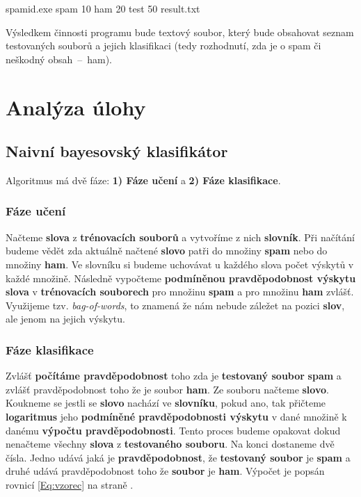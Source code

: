 \documentclass[12pt]{report}
\newcommand\myindent[1]{						
	\setlength\parindent{5mm}
	#1
	\setlength\parindent{0mm}
}
\begin{document}
	\myindent{spamid.exe spam 10 ham 20 test 50 result.txt}
	
	Výsledkem činnosti programu bude textový soubor, který bude obsahovat seznam testovaných
	souborů a jejich klasifikaci (tedy rozhodnutí, zda je o spam či neškodný obsah~–~ham).



	\chapter{Analýza úlohy}
	
	\section{Naivní bayesovský klasifikátor}
	
	Algoritmus má dvě fáze: \textbf{1) Fáze učení} a \textbf{2) Fáze klasifikace}.
	
		\subsection{Fáze učení}
		
		Načteme \textbf{slova} z \textbf{trénovacích souborů} a vytvoříme z nich \textbf{slovník}. Při načítání budeme vědět zda aktuálně načtené \textbf{slovo} patři do množiny \textbf{spam} nebo do množiny \textbf{ham}. Ve slovníku si budeme uchovávat u každého slova počet výskytů v každé množině. Následně vypočteme \textbf{podmíněnou pravděpodobnost výskytu slova} v \textbf{trénovacích souborech} pro množinu \textbf{spam} a pro množinu \textbf{ham} zvlášť. Využijeme tzv. \textit{bag-of-words}, to znamená že nám nebude záležet na pozici \textbf{slov}, ale jenom na jejich výskytu.
		
		\subsection{Fáze klasifikace}
		
		Zvlášť \textbf{počítáme pravděpodobnost} toho zda je \textbf{testovaný soubor} \textbf{spam} a zvlášť pravděpodobnost toho že je soubor \textbf{ham}. Ze souboru načteme \textbf{slovo}. Koukneme se jestli se \textbf{slovo} nachází ve \textbf{slovníku}, pokud ano, tak přičteme \textbf{logaritmus} jeho \textbf{podmíněné pravděpodobnosti výskytu} v dané množině k danému \textbf{výpočtu pravděpodobnosti}. Tento proces budeme opakovat dokud nenačteme všechny \textbf{slova} z \textbf{testovaného souboru}. Na konci dostaneme dvě čísla. Jedno udává jaká je \textbf{pravděpodobnost}, že \textbf{testovaný soubor} je \textbf{spam} a druhé udává pravděpodobnost toho že \textbf{soubor} je \textbf{ham}. Výpočet je popsán rovnicí \ref{Eq:vzorec} na straně \pageref{Eq:vzorec}.
		
\end{document}
